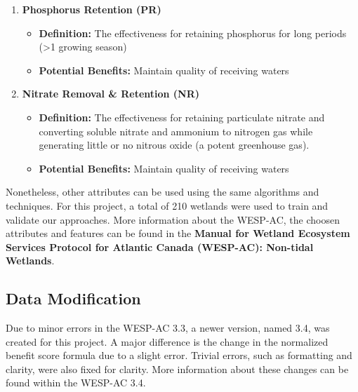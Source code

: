 \documentclass[12pt,letterpaper]{article}
\begin{document}
\begin{enumerate}
\begin{enumerate}
        \item \textbf{Phosphorus Retention (PR)}
        \begin{itemize}
            \item \textbf{Definition:} The effectiveness for retaining phosphorus for long periods (>1 growing season)
            \item \textbf{Potential Benefits:} Maintain quality of receiving waters
        \end{itemize}

        \item \textbf{Nitrate Removal \& Retention (NR)}
        \begin{itemize}
            \item \textbf{Definition:} The effectiveness for retaining particulate nitrate and converting soluble nitrate and ammonium to nitrogen gas while generating little or no nitrous oxide (a potent greenhouse gas).
            \item \textbf{Potential Benefits:} Maintain quality of receiving waters
        \end{itemize}

    \end{enumerate}

\end{enumerate}

Nonetheless, other attributes can be used using the same algorithms and techniques.
For this project, a total of 210 wetlands were used to train and validate our approaches.
More information about the WESP-AC, the choosen attributes and features can be found in the \textbf{Manual for Wetland Ecosystem Services Protocol for Atlantic Canada (WESP-AC): Non-tidal Wetlands}.


\subsection{Data Modification}\label{sec:data_mod}
Due to minor errors in the WESP-AC 3.3, a newer version, named 3.4, was created for this project.
A major difference is the change in the normalized benefit score formula due to a slight error.
Trivial errors, such as formatting and clarity, were also fixed for clarity.
More information about these changes can be found within the WESP-AC 3.4.
\end{document}
